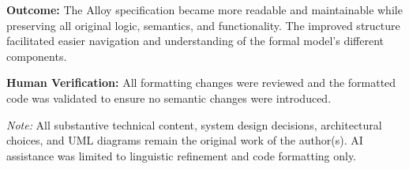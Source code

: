\textbf{Outcome:} The Alloy specification became more readable and maintainable while preserving all original logic, semantics, and functionality. The improved structure facilitated easier navigation and understanding of the formal model's different components.

\textbf{Human Verification:} All formatting changes were reviewed and the formatted code was validated to ensure no semantic changes were introduced.

\vspace{1em}
\noindent\textit{Note:} All substantive technical content, system design decisions, architectural choices, and UML diagrams remain the original work of the author(s). AI assistance was limited to linguistic refinement and code formatting only.